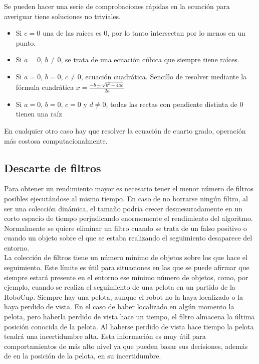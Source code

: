 \begin{enumerate}
Se pueden hacer una serie de comprobaciones rápidas en la ecuación para averiguar tiene soluciones no triviales.
\begin{itemize}
\item Si $e = 0$ una de las raíces es $0$, por lo tanto intersectan por lo menos en un punto.
\item Si $a=0$, $b \neq 0$, se trata de una ecuación cúbica que siempre tiene raíces.
\item Si $a=0$, $b=0$, $c \neq 0$, ecuación cuadrática. Sencillo de resolver mediante la fórmula cuadrática $x=\frac{-b \pm \sqrt{b^2 - 4ac}}{2a}$
\item Si $a=0$, $b=0$, $c=0$ y $d \neq 0$, todas las rectas con pendiente distinta de 0 tienen una raíz
\end{itemize}

En cualquier otro caso hay que resolver la ecuación de cuarto grado, operación más costosa computacionalmente.

\end{enumerate}

\subsection{Descarte de filtros}
\label{subsec:descartefiltros}

Para obtener un rendimiento mayor es necesario tener el menor número de filtros posibles ejecutándose al mismo tiempo. En caso de no borrarse ningún filtro, al ser una colección dinámica, el tamaño podría crecer desmesuradamente en un corto espacio de tiempo perjudicando enormemente el rendimiento del algoritmo. Normalmente se quiere eliminar un filtro cuando se trata de un falso positivo o cuando un objeto sobre el que se estaba realizando el seguimiento desaparece del entorno.\\

La colección de filtros tiene un número mínimo de objetos sobre los que hace el seguimiento. Este límite es útil para situaciones en las que se puede afirmar que siempre estará presente en el entorno ese mínimo número de objetos, como, por ejemplo, cuando se realiza el seguimiento de una pelota en un partido de la RoboCup. Siempre hay una pelota, aunque el robot no la haya localizado o la haya perdido de vista. En el caso de haber localizado en algún momento la pelota, pero haberla perdido de vista hace un tiempo, el filtro almacena la última posición conocida de la pelota. Al haberse perdido de vista hace tiempo la pelota tendrá una incertidumbre alta. Esta información es muy útil para comportamientos de más alto nivel ya que pueden basar sus decisiones, además de en la posición de la pelota, en su incertidumbre.\\

